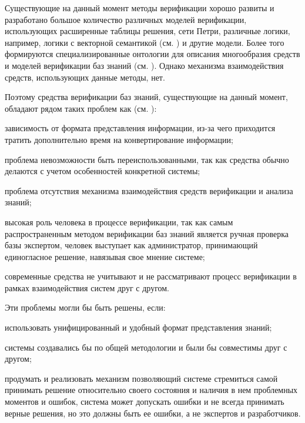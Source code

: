 Существующие на данный момент методы верификации хорошо развиты и разработано большое количество различных моделей верификации, использующих расширенные таблицы решения, сети Петри, различные логики, например, логики с векторной семантикой (см. ) и другие модели. Более того формируются специализированные онтологии для описания многообразия средств и моделей верификации баз знаний (см. ). Однако механизма взаимодействия средств, использующих данные методы, нет.

Поэтому средства верификации баз знаний, существующие на данный момент, обладают рядом таких проблем как (см. ):
\begin{textitemize}
    \item зависимость от формата представления информации, из-за чего приходится тратить дополнительно время на конвертирование информации;
    \item проблема невозможности быть переиспользованными, так как средства обычно делаются с учетом особенностей конкретной системы;
    \item проблема отсутствия механизма взаимодействия средств верификации и анализа знаний;
    \item высокая роль человека в процессе верификации, так как самым распространенным методом верификации баз знаний является ручная проверка базы экспертом, человек выступает как администратор, принимающий единогласное решение, навязывая свое мнение системе;
    \item современные средства не учитывают и не рассматривают процесс верификации в рамках взаимодействия систем друг с другом.
\end{textitemize}

Эти проблемы могли бы быть решены, если:
\begin{textitemize}
    \item использовать унифицированный и удобный формат представления знаний;
    \item системы создавались бы по общей методологии и были бы совместимы друг с другом;
    \item продумать и реализовать механизм позволяющий системе стремиться самой принимать решение относительно своего состояния и наличия в нем проблемных моментов и ошибок, система может допускать ошибки и не всегда принимать верные решения, но это должны быть ее ошибки, а не экспертов и разработчиков.
\end{textitemize}

